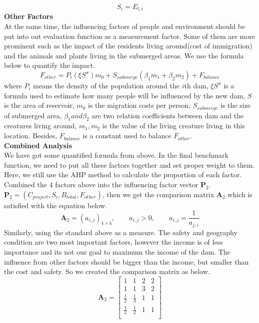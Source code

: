 \documentclass{mcmthesis}
\begin{document}
\begin{equation}
S_{i} = E_{l,i}
\end{equation}
\textbf{Other Factors}\\
\indent At the same time, the influencing factors of people and environment should be put into out evaluation function as a measurement factor. Some of them are more prominent such as the impact of the residents living around(cost of immigration) and the animals and plants living in the submerged areas. We use the formula below to quantify the impact.
\begin{equation}
F_{other} = P_{i}({\xi}S^{\sigma})m_{0} + S_{submerge}(\beta_{1}m_{1} + \beta_{2}m_{2}) + F_{balance}
\end{equation}
where $P_{i}$ means the density of the population around the $i$th dam, ${\xi}S^{\sigma}$ is a formula used to estimate how many people will be influenced by the new dam, $S$ is the area of reservoir, $m_{0}$ is the migration costs per person, $S_{submerge}$ is the size of submerged area, $\beta_{1} and \beta_{2}$ are two relation coefficients between dam and the creatures living around, $m_{1},m_{2}$ is the value of the living creature living in this location. Besides, $F_{balance}$ is a constant used to balance $F_{other}$.\\
\textbf{Combined Analysis}\\
\indent We have got some quantified formula from above. In the final benchmark function, we need to put all these factors together and set proper weight to them. Here, we still use the AHP method to calculate the proportion of each factor. Combined the 4 factors above into the influencing factor vector $\textbf{P}_2$. $\textbf{P}_2 = (C_{project}, S_{i}, B_{total}, F_{other})$, then we get the comparison matrix $\textbf{A}_2$ which is satisfied with the equation below.
\[\textbf{A}_2 = (a_{i,j})_{4\times4}, \qquad a_{i,j}>0, \qquad a_{i,j} = \frac{1}{a_{j,i}}\]
\indent Similarly, using the standard above as a measure. The safety and geography condition are two most important factors, however the income is of less importance and its not our goal to maximum the income of the dam. The influence from other factors should be bigger than the income, but smaller than the cost and safety. So we created the comparison matrix as below.
\[\textbf{A}_2 =
\left[
\begin{matrix}
1 & 1 & 2 & 2 \\
1 & 1 & 3 & 2 \\
\frac{1}{2}& \frac{1}{3} & 1 & 1 \\
\frac{1}{2} & \frac{1}{2} & 1 & 1 \\
\end{matrix}
\right]
\]\\
\end{document}
